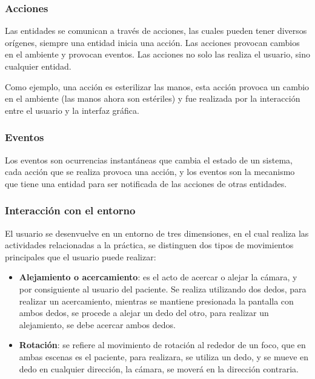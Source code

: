 \subsubsection{Acciones}

Las entidades se comunican a través de acciones, las cuales pueden tener
diversos orígenes, siempre una entidad inicia una acción. Las acciones provocan
cambios en el ambiente y provocan eventos. Las acciones no solo las
realiza el usuario, sino cualquier entidad.

Como ejemplo, una acción es esterilizar las manos, esta acción provoca un
cambio en el ambiente (las manos ahora son estériles) y fue realizada por la
interacción entre el usuario y la interfaz gráfica.

\subsubsection{Eventos}

Los eventos son ocurrencias instantáneas que cambia el estado de un
sistema\cite{banks2000dm}, cada acción que se realiza provoca una acción, y los
eventos son la mecanismo que tiene una entidad para ser notificada de las
acciones de otras entidades.

\subsubsection{Interacción con el entorno}

El usuario se desenvuelve en un entorno de tres dimensiones, en el cual realiza las
actividades relacionadas a la práctica, se distinguen dos tipos de movimientos
principales que el usuario puede realizar:

\begin{itemize}
    \item \textbf{Alejamiento o acercamiento}: es el acto de acercar o alejar la
        cámara, y por consiguiente al usuario del paciente. Se realiza
        utilizando dos dedos, para realizar un acercamiento, mientras se
        mantiene presionada la pantalla con ambos dedos, se procede a alejar un
        dedo del otro, para realizar un alejamiento, se debe acercar ambos
        dedos.
    \item \textbf{Rotación}: se refiere al movimiento de rotación al rededor de
        un foco, que en ambas escenas es el paciente, para realizara, se utiliza
        un dedo, y se mueve en dedo en cualquier dirección, la cámara, se moverá
        en la dirección contraria.
\end{itemize}

